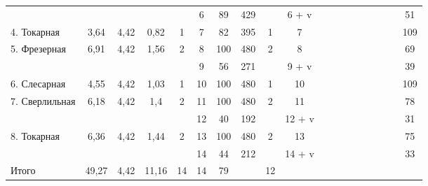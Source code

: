 \begin{landscape}
\begin{table} [h!]
{\begin{tabular}{
      | p{2.2cm} | c | c | c | c | c | c | c | c | c 
      | m{1cm} m{1cm} m{1cm} m{1cm} m{1cm} m{1cm} m{1cm} m{1cm} 
      | c |
      }
   & & & 
   & 
   & 6 
   & 89 & 429
   & 
   & 6 + v
   & & & & & & & &
   & 51 \\ \cline{1-10}\cline{19-19}

   4. Токарная
   & 3{,}64 & 4{,}42
   & 0{,}82 & 1
   & 7 
   & 82 & 395
   & 1
   & 7
   & & & & & & & &
   & 109 \\ \cline{1-10}\cline{19-19}

   \multirow{2}{*}{5. Фрезерная} 
   & \multirow{2}{*}{6{,}91} & \multirow{2}{*}{4{,}42}
   & \multirow{2}{*}{1{,}56} & \multirow{2}{*}{2}
   & 8 
   & 100 & 480
   & \multirow{2}{*}{2}
   & 8
   & & & & & & & &
   & 69 \\

   & & & 
   & 
   & 9 
   & 56 & 271
   & 
   & 9 + v
   & & & & & & & &
   & 39 \\ \cline{1-10}\cline{19-19}

   6. Слесарная
   & 4{,}55 & 4{,}42
   & 1{,}03 & 1
   & 10 
   & 100 & 480
   & 1
   & 10
   & & & & & & & &
   & 109 \\ \cline{1-10}\cline{19-19}

   \multirow{2}{*}{7. Сверлильная} 
   & \multirow{2}{*}{6{,}18} & \multirow{2}{*}{4{,}42}
   & \multirow{2}{*}{1{,}4} & \multirow{2}{*}{2}
   & 11 
   & 100 & 480
   & \multirow{2}{*}{2}
   & 11
   & & & & & & & &
   & 78 \\

   & & & 
   & 
   & 12 
   & 40 & 192
   & 
   & 12 + v
   & & & & & & & &
   & 31 \\ \cline{1-10}\cline{19-19}

   \multirow{2}{*}{8. Токарная} 
   & \multirow{2}{*}{6{,}36} & \multirow{2}{*}{4{,}42}
   & \multirow{2}{*}{1{,}44} & \multirow{2}{*}{2}
   & 13 
   & 100 & 480
   & \multirow{2}{*}{2}
   & 13
   & & & & & & & &
   & 75 \\

   & & & 
   & 
   & 14
   & 44 & 212
   & 
   & 14 + v
   & & & & & & & &
   & 33 \\ \cline{1-10}\cline{19-19}

   Итого
   & 49{,}27 & 4{,}42
   & 11{,}16 & 14
   & 14 
   & 79 & 
   & 12
   & 
   & & & & & & & &
   & \\ \hline

    \end{tabular}
  }
\end{table}


\end{landscape}
